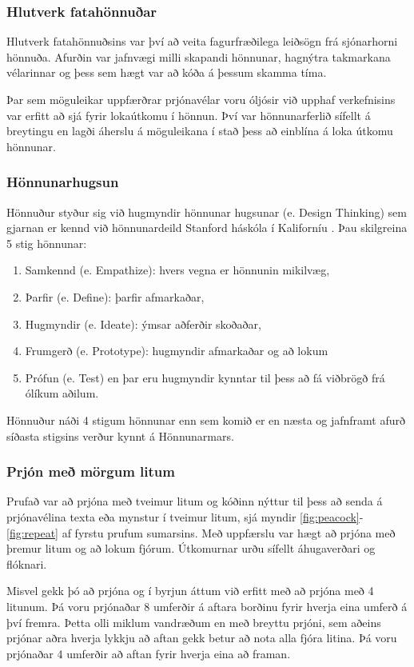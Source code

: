 \documentclass[a4paper,12pt,twoside]{article}
\begin{document}
\subsubsection{Hlutverk fatahönnuðar}
Hlutverk fatahönnuðsins var því að veita fagurfræðilega leiðsögn frá sjónarhorni hönnuða. Afurðin var jafnvægi milli skapandi hönnunar, hagnýtra takmarkana vélarinnar og þess sem hægt var að kóða á þessum skamma tíma. 

Þar sem möguleikar uppfærðrar prjónavélar voru óljósir við upphaf verkefnisins var erfitt að sjá fyrir lokaútkomu í hönnun. Því var hönnunarferlið sífellt á breytingu en lagði áherslu á möguleikana í stað þess að einblína á loka útkomu hönnunar. 

\subsubsection{Hönnunarhugsun}
Hönnuður styður sig við hugmyndir hönnunar hugsunar (e. Design Thinking) sem gjarnan er kennd við hönnunardeild Stanford háskóla í Kaliforníu \cite{designthinking}.  Þau skilgreina 5 stig hönnunar:
\begin{enumerate}
    \item Samkennd (e. Empathize): hvers vegna er hönnunin mikilvæg,
    \item Þarfir (e. Define): þarfir afmarkaðar,
    \item Hugmyndir (e. Ideate): ýmsar aðferðir skoðaðar,
    \item Frumgerð (e. Prototype): hugmyndir afmarkaðar og að lokum
    \item Prófun (e. Test) en þar eru hugmyndir kynntar til þess að fá viðbrögð frá ólíkum aðilum.
\end{enumerate}
Hönnuður náði  4 stigum hönnunar enn sem komið er en næsta og jafnframt afurð síðasta stigsins verður kynnt á Hönnunarmars.

\subsubsection{Prjón með mörgum litum}
Prufað var að prjóna með tveimur litum og kóðinn nýttur til þess að senda á prjónavélina texta eða mynstur í tveimur litum, sjá myndir \ref{fig:peacock}-\ref{fig:repeat} af fyrstu prufum sumarsins. Með uppfærslu var hægt að prjóna með þremur litum og að lokum fjórum. Útkomurnar urðu sífellt áhugaverðari og flóknari. 

Misvel gekk þó að prjóna og í byrjun áttum við erfitt með að prjóna með 4 litunum. Þá voru prjónaðar 8 umferðir á aftara borðinu fyrir hverja eina umferð á því fremra. Þetta olli miklum vandræðum en með breyttu prjóni, sem aðeins prjónar aðra hverja lykkju að aftan gekk betur að nota alla fjóra litina. Þá  voru prjónaðar 4 umferðir að aftan fyrir hverja eina að framan. 
\end{document}

